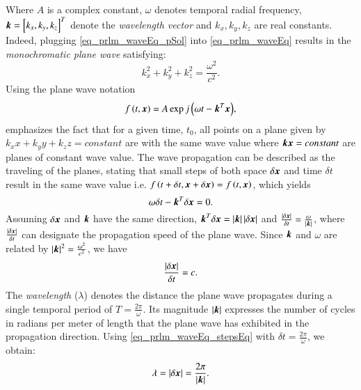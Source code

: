 Where $A$ is a complex constant, $\omega$ denotes temporal radial frequency, $\boldsymbol{k} = \left[{k_{x},k_{y},k_{z}}\right]^{T}$ denote the \emph{wavelength vector} and $k_{x},k_{y},k_{z}$ are real constants. 
Indeed, plugging \eqref{eq_prlm_waveEq_pSol} into \eqref{eq_prlm_waveEq} results in the \emph{monochromatic plane wave} satisfying:
\begin{equation}
\label{eq_prlm_waveEq_subs}
k_{x}^{2}+k_{y}^{2}+k_{z}^{2} = \frac{\omega^{2}}{c^{2}}.
\end{equation}
Using the plane wave notation 
\begin{equation}
\label{eq_prlm_waveEq_finSol}
f\left({t,\boldsymbol{x}}\right)=A\exp{j\left({\omega{t}-\boldsymbol{k}^{T}\boldsymbol{x}}\right)},
\end{equation}
emphasizes the fact that for a given time, $t_{0}$, all points on a plane given by $k_{x}x+k_{y}y+k_{z}z = constant$ are with the same wave value where $\boldsymbol{k}\boldsymbol{x}=constant$ are planes of constant wave value.
The wave propagation can be described as the traveling of the planes, stating that small steps of both space $\delta{\boldsymbol{x}}$ and time $\delta{t}$ result in the same wave value i.e. $f\left({t+\delta{t},\boldsymbol{x}+\delta{\boldsymbol{x}}}\right) = f\left({t,\boldsymbol{x}}\right)$, which yields
\begin{equation}
\omega\delta{t}-\boldsymbol{k}^{T}\delta\boldsymbol{x}=0.
\end{equation}
Assuming $\delta\boldsymbol{x}$ and $\boldsymbol{k}$ have the same direction, $\boldsymbol{k}^{T}\delta\boldsymbol{x} = \left\vert\boldsymbol{k}\right\vert\left\vert\delta\boldsymbol{x}\right\vert$ and $\frac{\left\vert\delta{\boldsymbol{x}}\right\vert}{\delta{t}} = \frac{\omega}{\left\vert\boldsymbol{k}\right\vert}$, where $\frac{\left\vert\delta{\boldsymbol{x}}\right\vert}{\delta{t}}$ can designate the propagation speed of the plane wave. 
Since $\boldsymbol{k}$ and $\omega$ are related by $\left\vert\boldsymbol{k}\right\vert^{2}=\frac{\omega^{2}}{c^{2}}$, we have
\begin{equation}
\label{eq_prlm_waveEq_stepsEq}
\frac{\left\vert\delta{\boldsymbol{x}}\right\vert}{\delta{t}}=c.
\end{equation}
The \emph{wavelength} ($\lambda$) denotes the distance the plane wave propagates during a single temporal period of $T=\frac{2\pi}{\omega}$.
Its magnitude $\left\vert\boldsymbol{k}\right\vert$ expresses the number of cycles in radians per meter of length that the plane wave has exhibited in the propagation direction.
Using \eqref{eq_prlm_waveEq_stepsEq} with $\delta{t} = \frac{2\pi}{\omega}$, we obtain:
\begin{equation}
\lambda=\left\vert\delta{\boldsymbol{x}}\right\vert=\frac{2\pi}{\left\vert\boldsymbol{k}\right\vert}.
\end{equation}
